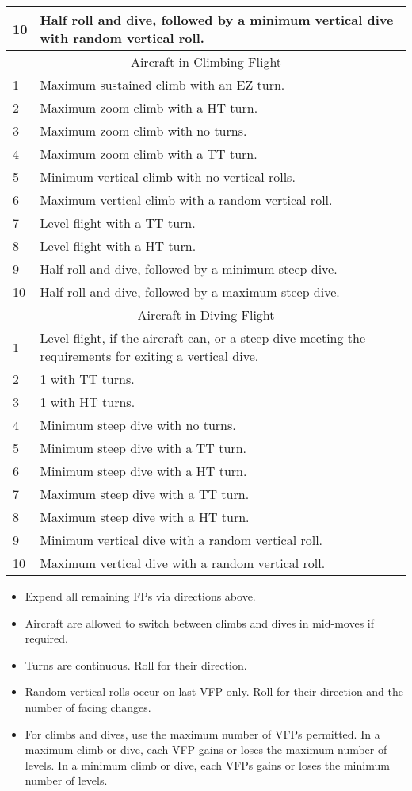\begin{onecolumntablefloat}
\begin{onecolumntable}
{\begin{tabularx}{\linewidth}{lX}
10  &Half roll and dive, followed by a minimum vertical dive with random vertical roll.\\
\midrule
\multicolumn{2}{c}{Aircraft in Climbing Flight}\\
\midrule
1   &Maximum sustained climb with an EZ turn.\\
2   &Maximum zoom climb with a HT turn.\\
3   &Maximum zoom climb with no turns.\\
4   &Maximum zoom climb with a TT turn.\\
5   &Minimum vertical climb with no vertical rolls.\\
6   &Maximum vertical climb with a random vertical roll.\\
7   &Level flight with a TT turn.\\
8   &Level flight with a HT turn.\\
9   &Half roll and dive, followed by a minimum steep dive.\\
10  &Half roll and dive, followed by a maximum steep dive.\\
\midrule
\multicolumn{2}{c}{Aircraft in Diving Flight}\\
\midrule
1   &Level flight, if the aircraft can, or a steep dive meeting the requirements for exiting a vertical dive.\\
2   &1 with TT turns.\\
3   &1 with HT turns.\\
4   &Minimum steep dive with no turns.\\
5   &Minimum steep dive with a TT turn.\\
6   &Minimum steep dive with a HT turn.\\
7   &Maximum steep dive with a TT turn.\\
8   &Maximum steep dive with a HT turn.\\
9   &Minimum vertical dive with a random vertical roll.\\
10  &Maximum vertical dive with a random vertical roll.\\
\bottomrule
\end{tabularx}
\begin{tablenote}{\linewidth}
\begin{itemize}
    \item Expend all remaining FPs via directions above.
    \item Aircraft are allowed to switch between climbs and dives in mid-moves if required. 
    \item Turns are continuous. Roll for their direction. 
    \item Random vertical rolls occur on last VFP only. Roll for their direction and the number of facing changes.
    \item For climbs and dives, use the maximum number of VFPs permitted. In a maximum climb or dive, each VFP gains or loses the maximum number of levels. In a minimum climb or dive, each VFPs gains or loses the minimum number of levels.
\end{itemize}
\end{tablenote}

}
\end{onecolumntable}
\end{onecolumntablefloat}
